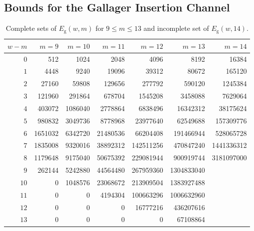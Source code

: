 \documentclass[journal, twocol]{IEEEtran}
\newcommand{\Eg}{{E_{\text{g}}}}
\begin{document}
\subsection{Bounds for the Gallager Insertion Channel}
\label{s:nrg}

\begin{table}
\centering
\footnotesize
\begin{tabular}{|@{\hskip.04cm}r@{\hskip.04cm}||@{\hskip.04cm}r@{\hskip.04cm}|@{\hskip.04cm}r@{\hskip.04cm}|@{\hskip.04cm}r@{\hskip.04cm}|@{\hskip.04cm}r@{\hskip.04cm}|@{\hskip.04cm}r@{\hskip.04cm}|@{\hskip.04cm}r@{\hskip.04cm}|}
\hline
$w\!-\!m$  & $m=9$    & $m=10$    & $m=11$    & $m=12$       & $m=13$     & $m=14$     \\\hline\hline
$0$    & 512      & 1024      & 2048      & 4096         & 8192       & 16384      \\\hline
$1$    & 4448     & 9240	  & 19096     & 39312        & 80672      & 165120     \\\hline
$2$    & 27160	  & 59808     & 129656	  & 277792       & 590120     & 1245384    \\\hline
$3$    & 121960	  & 291864    & 678704	  & 1545208      & 3458088    & 7629064    \\\hline
$4$    & 403072	  & 1086040   & 2778864	  & 6838496	     & 16342312   & 38175624   \\\hline
$5$    & 980832   & 3049736   & 8778968	  & 23977640	 & 62549688   & 157309776  \\\hline
$6$    & 1651032  & 6342720   & 21480536  & 66204408	 & 191466944  & 528065728  \\\hline
$7$    & 1835008  & 9320016   & 38892312  & 142511256	 & 470847240  & 1441336312 \\\hline
$8$    & 1179648  & 9175040   & 50675392  & 229081944	 & 900919744  & 3181097000 \\\hline
$9$    & 262144	  & 5242880	  & 44564480  & 267959360	 & 1304833040 &            \\\hline
$10$   & 0        & 1048576	  & 23068672  & 213909504	 & 1383927488 &            \\\hline
$11$   & 0        & 0         & 4194304	  & 100663296    & 1006632960 & 	       \\\hline
$12$   & 0        & 0         & 0         & 16777216     & 436207616  &            \\\hline
$13$   & 0        & 0         & 0         & 0            & 67108864	  &            \\\hline
\end{tabular}
\caption{Complete sets of $\Eg(w,m)$ for $9 \leq m \leq 13$ and incomplete set of $\Eg(w, 14)$.}
\label{t:e2wmc}
\end{table}
\end{document}
